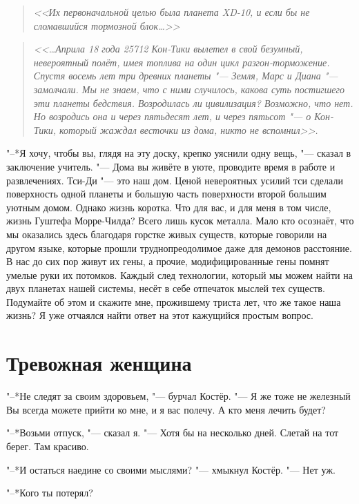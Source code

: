 \documentclass[a4paper,10pt]{book}
\newcommand{\ldotst}{\so{...}\xspace}
\begin{document}
\begin{quote}\textit{<<Их первоначальной целью была планета XD-10,
и если бы не сломавшийся тормозной блок\ldots>>}\end{quote}

\begin{quote}
\textit{<<\dots Априла 18 года 25712 Кон-Тики вылетел в свой безумный, 
невероятный полёт, имея топлива на один цикл разгон-торможение. Спустя восемь 
лет три 
древних планеты "--- Земля, Марс и Диана "--- замолчали. Мы не знаем, что с 
ними 
случилось, какова суть постигшего эти планеты бедствия. Возродилась ли 
цивилизация? Возможно, что нет. Но возродись она и через пятьдесят лет, и через 
пятьсот "--- о Кон-Тики, который жаждал весточки из дома, никто не 
вспомнил>>.}\end{quote}

"--*Я хочу, чтобы вы, глядя на эту доску, крепко уяснили одну вещь, "--- сказал 
в заключение учитель. "--- Дома вы живёте в уюте, проводите время в работе и 
развлечениях. Тси-Ди "--- это наш дом. Ценой невероятных усилий тси сделали 
поверхность одной 
планеты и большую часть поверхности второй большим уютным домом. Однако жизнь 
коротка. Что для вас, и для меня в том числе, жизнь Гуштефа Морре-Чилда? Всего 
лишь кусок металла. Мало кто осознаёт, что мы оказались здесь благодаря горстке 
живых существ, которые говорили на другом языке, которые прошли 
труднопреодолимое даже для демонов расстояние. 
В нас до сих пор живут их гены, а прочие, модифицированные гены помнят 
умелые руки их потомков. Каждый след технологии, который мы можем найти на двух 
планетах нашей системы, несёт в себе отпечаток мыслей тех существ. Подумайте об 
этом и скажите мне, прожившему триста лет, что же такое наша жизнь? Я уже 
отчаялся найти ответ на этот кажущийся простым вопрос.
 
 \section{Тревожная женщина}

"--*Не следят за своим здоровьем, "--- бурчал Костёр. "--- Я же тоже не 
железный\ldotst Вы всегда можете прийти ко мне, и я вас полечу. А кто меня 
лечить будет?

"--*Возьми отпуск, "--- сказал я. "--- Хотя бы на несколько дней. Слетай на тот 
берег. Там красиво.

"--*И остаться наедине со своими мыслями? "--- хмыкнул Костёр. "--- Нет уж.

"--*Кого ты потерял?
\end{document}
